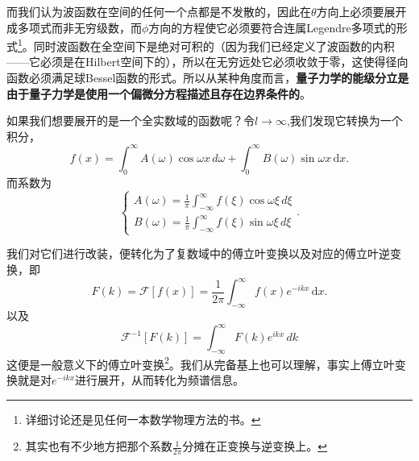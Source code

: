 \documentclass[12pt,a4paper,openany,twoside]{book}
\numberwithin{equation}{section}
\newcommand{\ud}{\mathrm{d}}
\begin{document}
        而我们认为波函数在空间的任何一个点都是不发散的，因此在$\theta$方向上必须要展开成多项式而非无穷级数，而$\phi$方向的方程使它必须要符合连属Legendre多项式的形式\footnote{详细讨论还是见任何一本数学物理方法的书。}。同时波函数在全空间下是绝对可积的（因为我们已经定义了波函数的内积——它必须是在Hilbert空间下的），所以在无穷远处它必须收敛于零，这使得径向函数必须满足球Bessel函数的形式。所以从某种角度而言，\textbf{量子力学的能级分立是由于量子力学是使用一个偏微分方程描述且存在边界条件的}。

        如果我们想要展开的是一个全实数域的函数呢？令$l \to \infty$,我们发现它转换为一个积分，
        \begin{equation}
          f(x) = \int _0 ^\infty A(\omega) \cos{\omega x} \, d\omega + \int _0 ^\infty B(\omega) \sin{\omega x} \, \ud x  
          .
        \end{equation}
        而系数为
        \begin{equation}
          \begin{cases}
            A(\omega) = \frac{1}{\pi} \int ^\infty _{-\infty} f(\xi) \cos{\omega \xi} \, d\xi \\
            B(\omega) = \frac{1}{\pi} \int ^\infty _{-\infty} f(\xi) \sin{\omega \xi}\, d\xi 
          \end{cases}
          .
        \end{equation}

        我们对它们进行改装，便转化为了复数域中的傅立叶变换以及对应的傅立叶逆变换，即
        \begin{equation}
          F(k) =  \mathcal{F} [f(x)] = \frac{1}{2\pi}\int_{-\infty}^{\infty} f(x) e^{-ikx} \, \ud x 
          .
        \end{equation}
        以及
        \begin{equation}
          \mathcal{F}^{-1} [F(k)] = \int_{-\infty} ^\infty F(k) e^{ikx} \, dk
        \end{equation}
        这便是一般意义下的傅立叶变换\footnote{其实也有不少地方把那个系数$\frac{1}{2\pi}$分摊在正变换与逆变换上。}。我们从完备基上也可以理解，事实上傅立叶变换就是对$e^{-ikx}$进行展开，从而转化为频谱信息。
\end{document}
